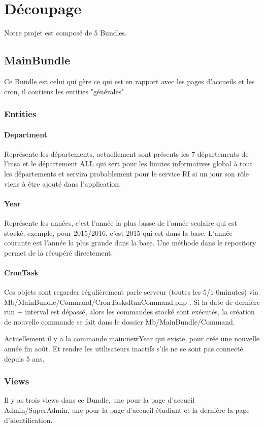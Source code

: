 \chapter{Découpage}
Notre projet est composé de 5 Bundles.

\section{MainBundle}
Ce Bundle est celui qui gère ce qui est en rapport avec les pages d'accueils et les cron, il contiens les entities "générales"

\subsection{Entities}
\subsubsection{Department}
Représente les départements, actuellement sont présents les 7 départements de l'insa et le département ALL qui sert pour les limites informatives global à tout les départements et servira probablement pour le service RI si un jour son rôle viens à être ajouté dans l'application.

\subsubsection{Year}
Représente les années, c'est l'année la plus basse de l'année scolaire qui est stocké, exemple, pour 2015/2016, c'est 2015 qui est dans la base. L'année courante est l'année la plus grande dans la base. Une méthode dans le repository permet de la récupéré directement.

\subsubsection{CronTask}
Ces objets sont regarder régulièrement parle serveur (toutes les 5/1 0minutes) via Mb/MainBundle/Command/CronTasksRunCommand.php . 
Si la date de dernière run + interval est dépassé, alors les commandes stocké sont exécutés, la création de nouvelle commande se fait dans le dossier Mb/MainBundle/Command. 

Actuellement il y a la commande main:newYear qui existe, pour crée une nouvelle année fin août. Et rendre les utilisateurs inactifs s'ils ne se sont pas connecté depuis 5 ans.


\subsection{Views}
Il y as trois views dans ce Bundle, une pour la page d'accueil Admin/SuperAdmin, une pour la page d'accueil étudiant et la dernière la page d'identification.

